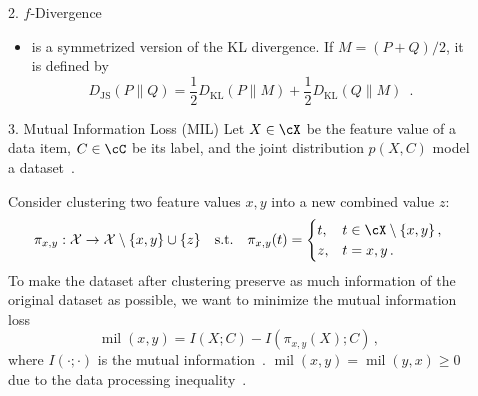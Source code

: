 \documentclass[final]{beamer}
\DeclareMathOperator{\mil}{mil}
\newcommand{\kl}[2]{D_{\mathrm{KL}}( #1 \parallel #2 )}
\newcommand{\js}[2]{D_{\mathrm{JS}}( #1 \parallel #2 )}
\newlength{\sepwid}
\newlength{\onecolwid}
\begin{document}
\begin{frame}[t]
\begin{columns}[t]
\begin{column}{\onecolwid}
\begin{block}{2. $ f $-Divergence}
\begin{itemize}
		\item {}
			 is a symmetrized version 
			of the 
			KL divergence. If 
			 $ M=(P+Q)/2 $, it 
			is defined by
			\begin{equation}\label{eq:jensen-shannon}
			\js{P}{Q} = \frac{1}{2} \kl{P}{M} + \frac{1}{2} \kl{Q}{M}\enspace.
			\end{equation}
\end{itemize}
	\end{block}
	\begin{block}{3. Mutual Information Loss (MIL)}
		Let $ X\in \cX $ be the feature value of a data item, $ C\in \cC $ be 
		its 
		label, and the joint distribution $ p(X,C) $ model a 
		dataset~\citep{bateni2019categorical}.
		
		Consider clustering two feature values $ x,y $ into a new combined 
		value $ 
		z $:
		\[ 
		\pi_{x,y}: \mathcal{X}\to \mathcal{X}\setminus\{x,y\}\cup 
		\{z\}\quad\text{s.t.}\quad \pi_{x,y}(t) = \begin{cases}
		t, & t\in \cX\setminus \{x, y\}\,,\\
		z, & t = x,y\,.
		\end{cases}
		\]
		To make the dataset after clustering
		preserve as much information of the original dataset as 
		possible, 
		we want to minimize
		the mutual 
		information loss 
		\[\mil(x,y) = I(X;C) - I(\pi_{x,y}(X);C)\,,\]
		where $I(\cdot;\cdot)$ is the mutual 
		information~\cite{cover2012elements}.
		$ \mil(x,y)=\mil(y,x)\ge 0 $ due to the data processing 
		inequality~\cite{cover2012elements}.
	\end{block}
		\end{column} %
 		\begin{column}{\sepwid}\end{column} %
\begin{column}{\onecolwid} %
\vspace{-40pt}


\end{column}
\end{columns}
\end{frame}
\end{document}
